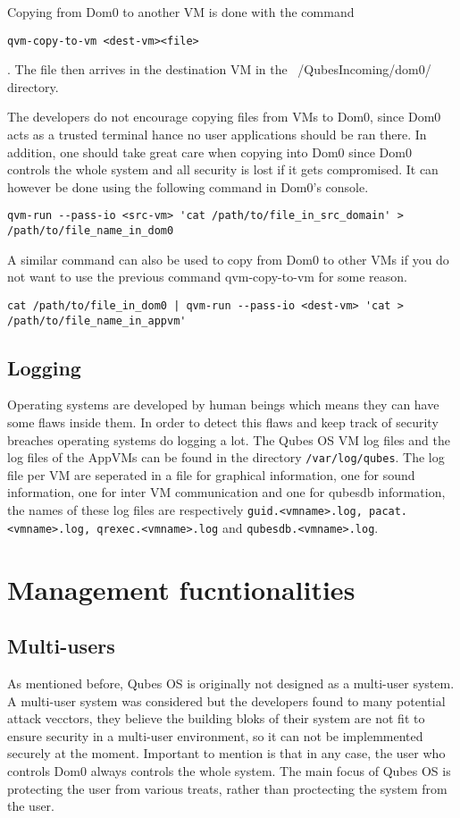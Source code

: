 \documentclass[runningheads,a4paper]{article}
\begin{document}
Copying from Dom0 to another
VM is done with the command
\begin{verbatim}
qvm-copy-to-vm <dest-vm><file>
\end{verbatim}.
The file then arrives in the destination VM in the
~/QubesIncoming/dom0/ directory.

The developers do not encourage copying files from VMs to Dom0, since
Dom0 acts as a trusted terminal hance no user applications should be
ran there.  In addition, one should take great care when copying into
Dom0 since Dom0 controls the whole system and all security is lost if
it gets compromised.  It can however be done using the following
command in Dom0's console.  
\begin{verbatim}
qvm-run --pass-io <src-vm> 'cat /path/to/file_in_src_domain' > /path/to/file_name_in_dom0 
\end{verbatim} 
 A similar command can also be used to copy from Dom0 to other VMs if
you do not want to use the previous command qvm-copy-to-vm for some
reason.  
\begin{verbatim}
cat /path/to/file_in_dom0 | qvm-run --pass-io <dest-vm> 'cat > /path/to/file_name_in_appvm'
\end{verbatim}

\subsection{Logging}
Operating systems are developed by human beings which means they can
have some flaws inside them. In order to detect this flaws and keep
track of security breaches operating systems do logging a lot. The
Qubes OS VM log files and the log files of the AppVMs can be found in
the directory \texttt{/var/log/qubes}. The log file per VM are
seperated in a file for graphical information, one for sound
information, one for inter VM communication and one for qubesdb
information, the names of these log files are respectively
\texttt{guid.<vmname>.log, pacat.<vmname>.log, qrexec.<vmname>.log}
and \texttt{qubesdb.<vmname>.log}.

\section{Management fucntionalities}
\subsection{Multi-users}
As mentioned before, Qubes OS is originally not designed as a
multi-user system.  A multi-user system was considered but the
developers found to many potential attack vecctors, they believe the
building bloks of their system are not fit to ensure security in a
multi-user environment, so it can not be implemmented securely at the
moment. Important to mention is that in any case, the user who
controls Dom0 always controls the whole system. The main focus of
Qubes OS is protecting the user from various treats, rather than
proctecting the system from the user.
\end{document}

